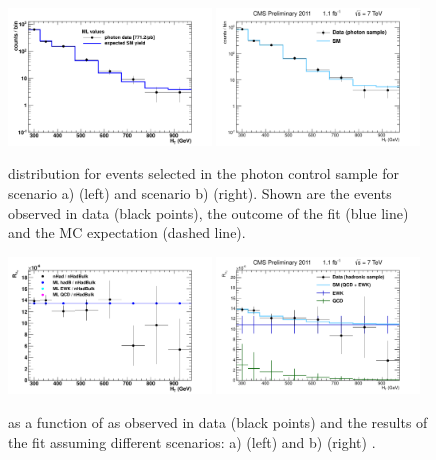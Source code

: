  \begin{figure}[t]
   \begin{center}
     \includegraphics[width = 0.48\textwidth]{figures/stats_plots/RQcdZero/photon_control_fit_logy.pdf}
     \includegraphics[width = 0.48\textwidth]{figures/stats_plots/RQcdFallingExp/photon_control_fit_logy.pdf}
     \caption{\label{fig:photon} \scalht distribution for events selected in the photon control sample for scenario a) (left) and scenario b) (right). Shown are the events observed in data (black points), the outcome of the fit (blue line) and the MC expectation (dashed line).}
   \end{center}
 \end{figure}

 \begin{figure}[t]
   \begin{center}
     \includegraphics[width = 0.48\textwidth]{figures/stats_plots/RQcdZero/hadronic_signal_alphaT_ratio.pdf}
     \includegraphics[width = 0.48\textwidth]{figures/stats_plots/RQcdFallingExp/hadronic_signal_alphaT_ratio.pdf}
     \caption{\label{fig:rat} \RaT as a function of \scalht as observed in data (black points) and the results of the fit assuming different scenarios: a) (left) and b) (right) .}
   \end{center}
 \end{figure}

